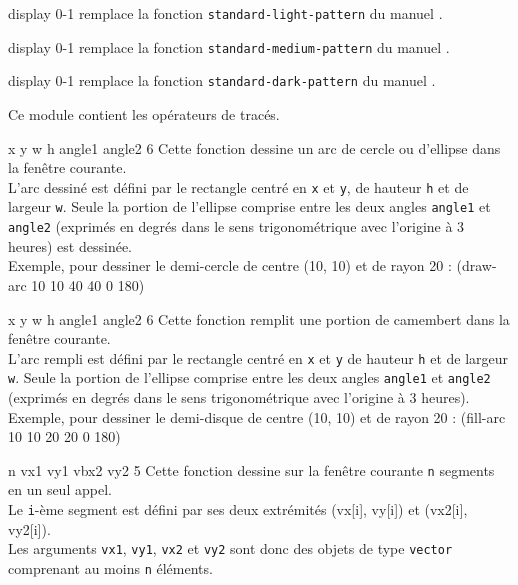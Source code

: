  {display} {0-1}
remplace la fonction {\tt standard-light-pattern} du manuel \LeLisp.

 {display} {0-1}
remplace la fonction {\tt standard-medium-pattern} du manuel \LeLisp.

 {display} {0-1}
remplace la fonction {\tt standard-dark-pattern} du manuel \LeLisp.




Ce module contient les op\'{e}rateurs de trac\'{e}s.


 {x y w h angle1 angle2} {6}
Cette fonction dessine un arc de cercle ou d'ellipse dans la fen\^{e}tre
courante.\\
L'arc dessin\'{e} est d\'{e}fini par le rectangle centr\'{e} en {\tt x} et {\tt y}, 
de hauteur {\tt h} et de largeur {\tt w}. Seule la portion de l'ellipse
comprise entre les deux angles {\tt angle1} et {\tt angle2} (exprim\'{e}s en
degr\'{e}s dans le sens trigonom\'{e}trique avec l'origine \`{a} 3 heures) est
dessin\'{e}e.\\
Exemple, pour dessiner le demi-cercle de centre (10, 10) et de rayon 20 :
\BeginLL
(draw-arc 10 10 40 40 0 180)
\EndLL


 {x y w h angle1 angle2} {6}
Cette fonction remplit une portion de camembert dans la fen\^{e}tre courante.\\
L'arc rempli est d\'{e}fini par le rectangle centr\'{e} en {\tt x} et {\tt y} 
de hauteur {\tt h} et de largeur {\tt w}. Seule la portion de l'ellipse
comprise entre les deux angles {\tt angle1} et {\tt angle2} (exprim\'{e}s en
degr\'{e}s dans le sens trigonom\'{e}trique avec l'origine \`{a} 3 heures).\\
Exemple, pour dessiner le demi-disque de centre (10, 10) et de rayon 20 :
\BeginLL
(fill-arc 10 10 20 20 0 180)
\EndLL


 {n vx1 vy1 vbx2 vy2} {5}
Cette fonction dessine sur la fen\^{e}tre courante {\tt n} segments en un seul
appel.\\
Le {\tt i}-\`{e}me segment  est  d\'{e}fini par ses deux extr\'{e}mit\'{e}s
(vx[i], vy[i]) et (vx2[i], vy2[i]).\\
Les arguments {\tt vx1}, {\tt vy1}, {\tt vx2} et {\tt vy2} sont donc des
objets de type {\tt vector} comprenant au moins {\tt n} \'{e}l\'{e}ments.\\



